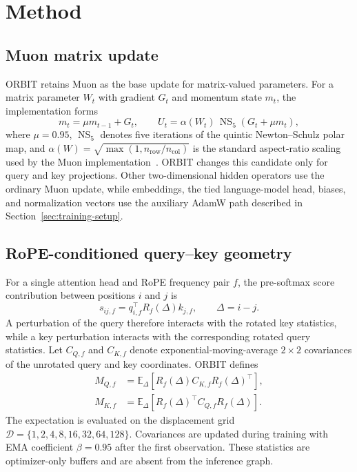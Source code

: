 \section{Method}

\subsection{Muon matrix update}
ORBIT retains Muon as the base update for matrix-valued parameters. For a matrix parameter
$W_t$ with gradient $G_t$ and momentum state $m_t$, the implementation forms
\begin{equation}
m_t=\mu m_{t-1}+G_t,\qquad
U_t=\alpha(W_t)\,\operatorname{NS}_5\!\left(G_t+\mu m_t\right),
\label{eq:muon-candidate}
\end{equation}
where $\mu=0.95$, $\operatorname{NS}_5$ denotes five iterations of the quintic
Newton--Schulz polar map, and
$\alpha(W)=\sqrt{\max(1,n_{\mathrm{row}}/n_{\mathrm{col}})}$ is the standard
aspect-ratio scaling used by the Muon implementation~\cite{jordan2024muon}. ORBIT changes
this candidate only for query and key projections. Other two-dimensional hidden operators
use the ordinary Muon update, while embeddings, the tied language-model head, biases, and
normalization vectors use the auxiliary AdamW path described in
Section~\ref{sec:training-setup}.

\subsection{RoPE-conditioned query--key geometry}
For a single attention head and RoPE frequency pair $f$, the pre-softmax score contribution
between positions $i$ and $j$ is
\begin{equation}
  s_{ij,f}=q_{i,f}^{\top}R_f(\Delta)k_{j,f},\qquad \Delta=i-j.
  \label{eq:rope-score}
\end{equation}
A perturbation of the query therefore interacts with the rotated key statistics, while a
key perturbation interacts with the corresponding rotated query statistics. Let
$C_{Q,f}$ and $C_{K,f}$ denote exponential-moving-average $2\times2$ covariances of the
unrotated query and key coordinates. ORBIT defines
\begin{align}
M_{Q,f} &= \mathbb{E}_{\Delta}\!\left[R_f(\Delta)C_{K,f}R_f(\Delta)^\top\right],\\
M_{K,f} &= \mathbb{E}_{\Delta}\!\left[R_f(\Delta)^\top C_{Q,f}R_f(\Delta)\right].
\label{eq:orbit-metrics}
\end{align}
The expectation is evaluated on the displacement grid
$\mathcal{D}=\{1,2,4,8,16,32,64,128\}$. Covariances are updated during training with EMA
coefficient $\beta=0.95$ after the first observation. These statistics are optimizer-only
buffers and are absent from the inference graph.

